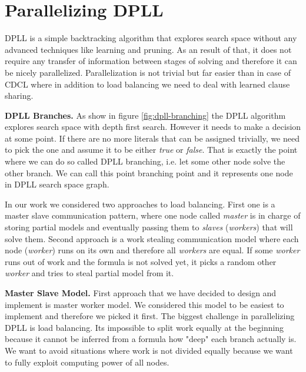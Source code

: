 \documentclass[letterpaper]{article}
\newcommand{\mypar}[1]{{\bf #1.}}
\begin{document}
\section{Parallelizing DPLL}\label{sec:parallel_dpll}

DPLL is a simple backtracking algorithm that explores search space without any advanced techniques like learning and pruning. As an result of that, it does not require any transfer of information between stages of solving and therefore it can be nicely parallelized. Parallelization is not trivial but far easier than in case of CDCL where in addition to load balancing we need to deal with learned clause sharing. 


\mypar{DPLL Branches}
As show in figure \ref{fig:dpll-branching} the DPLL algorithm explores search space with depth first search. However it needs to make a decision at some point. If there are no more literals that can be assigned trivially, we need to pick the one and assume it to be either \textit{true} or \textit{false}. That is exactly the point where we can do so called DPLL branching, i.e. let some other node solve the other branch. We can call this point branching point and it represents one node in DPLL search space graph. 

In our work we considered two approaches to load balancing. 
First one is a master slave communication pattern, where one node called \textit{master} is in charge of storing partial models and eventually passing them to \textit{slaves} (\textit{workers}) that will solve them.
Second approach is a work stealing communication model where each node (\textit{worker}) runs on its own and therefore all \textit{workers} are equal. If some \textit{worker} runs out of work and the formula is not solved yet, it picks a random other \textit{worker} and tries to steal partial model from it.

\mypar{Master Slave Model}
First approach that we have decided to design and implement is master worker model. We considered this model to be easiest to implement and therefore we picked it first. The biggest challenge in parallelizing DPLL is load balancing. Its impossible to split work equally at the beginning because it cannot be inferred from a formula how "deep" each branch actually is. We want to avoid situations where work is not divided equally because we want to fully exploit computing power of all nodes. 
\end{document}
